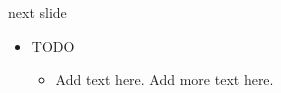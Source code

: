 
\begin{Slide}{next slide}

\begin{itemize}
\item TODO
\begin{itemize}
\item Add text here. Add more text here.
\end{itemize}
\end{itemize}
\end{Slide}